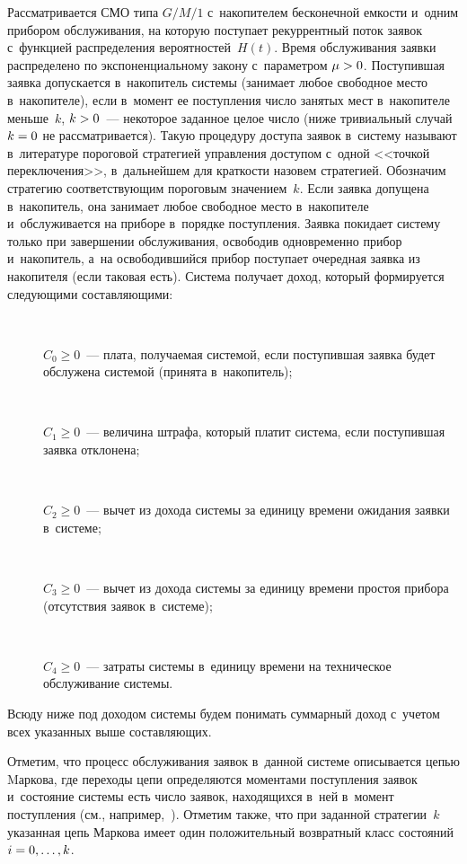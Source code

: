 \begin{multicols}{2}
  Рассматривается СМО типа $G/M/1$ с~накопителем бесконечной емкости 
и~одним прибором обслуживания, на которую поступает рекуррентный поток 
заявок с~функцией распределения вероятностей~$H(t)$. Время обслуживания 
заявки распределено по экспоненциальному закону с~параметром $\mu\hm>0$. 
Поступившая заявка допускается в~накопитель системы (занимает любое 
свободное место в~накопителе), если в~момент ее поступления число занятых 
мест в~накопителе меньше~$k$, $k\hm>0$~--- некоторое заданное целое число 
(ниже тривиальный случай $k\hm=0$ не рассматривается). Такую процедуру 
доступа заявок в~систему называют в~литературе пороговой стратегией 
управления доступом с~одной <<точкой переключения>>, в~дальнейшем для 
краткости назовем стратегией. Обозначим стратегию соответствующим 
пороговым значением~$k$. Если заявка допущена в~накопитель, она занимает 
любое свободное место в~накопителе и~обслуживается на приборе в~порядке 
поступления. Заявка покидает систему только при завершении обслуживания, 
освободив одновременно прибор и~накопитель, а~на освободившийся прибор 
поступает очередная заявка из накопителя (если таковая есть). Система 
получает доход, который формируется следующими составляющими:
  \begin{description}
  \item[\,] $C_0\geq 0$~--- плата, получаемая сис\-те\-мой, если поступившая 
заявка будет обслужена сис\-те\-мой (принята в~накопитель); 
  \item[\,] $C_1\geq 0$~--- величина штрафа, который платит сис\-те\-ма, если 
поступившая заявка отклонена;
  \item[\,] $C_2\geq 0$~--- вычет из дохода системы за единицу времени 
ожидания заявки в~системе;
  \item[\,] $C_3\geq 0$~--- вычет из дохода системы за единицу времени 
простоя прибора (отсутствия заявок в~системе);
  \item[\,] $C_4\geq 0$~--- затраты системы в~единицу времени на техническое 
обслуживание системы. 
  \end{description}
  
Всюду ниже под доходом системы будем понимать суммарный доход с~учетом 
всех указанных выше составляющих.
  
  Отметим, что процесс обслуживания заявок в~данной системе описывается 
цепью Mаркова, где переходы цепи определяются моментами поступления 
заявок и~состояние системы есть число заявок, находящихся в~ней в~момент 
поступления (см., например,~\cite{10-aga, 9-aga}). Отметим также, что при 
заданной стратегии~$k$ указанная цепь Маркова имеет один положительный 
возвратный класс состояний $i\hm=0,\ldots ,k$.
  

\end{multicols}
